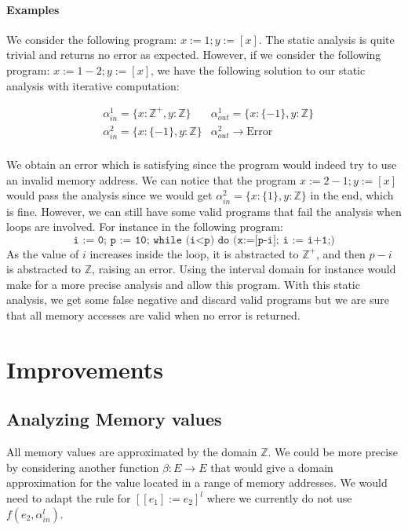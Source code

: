\paragraph{Examples}

We consider the following program: $x:= 1; y:= [x]$.
The static analysis is quite trivial and returns no error as expected.
However, if we consider the following program: $x:= 1 - 2; y:= [x]$, we have the following solution to our static analysis with iterative computation:

\begin{align*}
	& \alpha_{in}^1 = \lbrace x: \mathbb{Z}^{+}, y: \mathbb{Z} \rbrace & \alpha_{out}^1 = \lbrace x: \lbrace -1 \rbrace, y: \mathbb{Z} \rbrace \\
	& \alpha_{in}^2 = \lbrace x: \lbrace -1 \rbrace, y: \mathbb{Z} \rbrace & \alpha_{out}^2 \longrightarrow \text{Error} \\
\end{align*}

We obtain an error which is satisfying since the program would indeed try to use an invalid memory address.
We can notice that the program $x:= 2 - 1; y:= [x]$ would pass the analysis since we would get $\alpha_{in}^2 = \lbrace x: \lbrace 1 \rbrace, y: \mathbb{Z} \rbrace$ in the end, which is fine.
However, we can still have some valid programs that fail the analysis when loops are involved.
For instance in the following program:
$$\texttt{i := 0; p := 10; while (i<p) do (x:=[p-i]; i := i+1;)}$$
As the value of $i$ increases inside the loop, it is abstracted to $\mathbb{Z}^{+}$, and then $p-i$ is abstracted to $\mathbb{Z}$, raising an error. Using the interval domain for instance would make for a more precise analysis and allow this program.
With this static analysis, we get some false negative and discard valid programs but we are sure that all memory accesses are valid when no error is returned.
 

\section*{Improvements}

\subsection*{Analyzing Memory values}
All memory values are approximated by the domain $\mathbb{Z}$.
We could be more precise by considering another function $\beta: E \longrightarrow E$ that would give a domain approximation for the value located in a range of memory addresses.
We would need to adapt the rule for $\left[[e_1] := e_2\right]^l$ where we currently do not use $f(e_2, \alpha_{in}^l)$.


